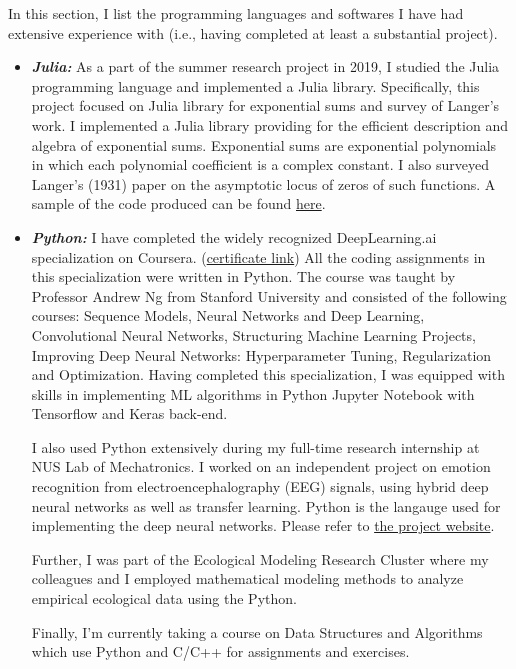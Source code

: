 \documentclass[11pt,reqno,oneside,a4paper]{article}
\begin{document}
In this section, I list the programming languages and softwares I have had extensive experience with (i.e., having completed at least a substantial project).

\begin{itemize}
	\item \emph{\textbf{Julia:}}
	As a part of the summer research project in 2019, I studied the Julia programming language and implemented a Julia library. Specifically, this project focused on Julia library for exponential sums and survey of Langer's work. I implemented a Julia library providing for the efficient description and algebra of exponential sums. Exponential sums are exponential polynomials in which each polynomial coefficient is a complex constant. I also surveyed Langer's (1931) paper on the asymptotic locus of zeros of such functions. A sample of the code produced can be found \href{https://www.unifiedtransformlab.com/outputs.html#Zha2019b}{here}.
	
	\item \emph{\textbf{Python:}}
	I have completed the widely recognized DeepLearning.ai specialization on Coursera. (\href{https://www.coursera.org/account/accomplishments/specialization/3PAXFXZG7WAZ}{certificate link}) All the coding assignments in this specialization were written in Python. The course was taught by Professor Andrew Ng from Stanford University and consisted of the following courses: Sequence Models, Neural Networks and Deep Learning, Convolutional Neural Networks, Structuring Machine Learning Projects, Improving Deep Neural Networks: Hyperparameter Tuning, Regularization and Optimization.  Having completed this specialization, I was equipped with skills in implementing ML algorithms in Python Jupyter Notebook with Tensorflow and Keras back-end. 
	
	I also used Python extensively during my full-time research internship at NUS Lab of Mechatronics. I worked on an independent project on emotion recognition from electroencephalography (EEG) signals, using hybrid deep neural networks as well as transfer learning. Python is the langauge used for implementing the deep neural networks. Please refer to \href{https://sites.google.com/view/liu-zhang/home for more details}{the project website}. 
	
	Further, I was part of the Ecological Modeling Research Cluster where my colleagues and I employed mathematical modeling methods to analyze empirical ecological data using the Python. 
	
	Finally, I’m currently taking a course on Data Structures and Algorithms which use Python and C/C++ for assignments and exercises.  
	

\end{itemize}
\end{document}
